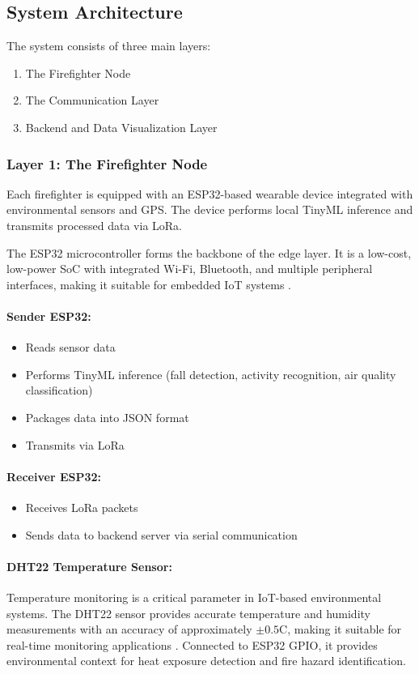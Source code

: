 \documentclass[12pt,a4paper]{article}
\begin{document}
	\subsection{System Architecture}
	The system consists of three main layers:
	\begin{enumerate}
		\item The Firefighter Node
		\item The Communication Layer
		\item Backend and Data Visualization Layer
	\end{enumerate}
	
	\subsubsection{Layer 1: The Firefighter Node}
	Each firefighter is equipped with an ESP32-based wearable device integrated with environmental sensors and GPS. The device performs local TinyML inference and transmits processed data via LoRa.
	
	The ESP32 microcontroller forms the backbone of the edge layer. It is a low-cost, low-power SoC with integrated Wi-Fi, Bluetooth, and multiple peripheral interfaces, making it suitable for embedded IoT systems \cite{dey2023}.
	
	\paragraph{Sender ESP32:}
	\begin{itemize}
		\item Reads sensor data
		\item Performs TinyML inference (fall detection, activity recognition, air quality classification)
		\item Packages data into JSON format
		\item Transmits via LoRa
	\end{itemize}
	
	\paragraph{Receiver ESP32:}
	\begin{itemize}
		\item Receives LoRa packets
		\item Sends data to backend server via serial communication
	\end{itemize}
	
	\paragraph{DHT22 Temperature Sensor:}
	Temperature monitoring is a critical parameter in IoT-based environmental systems. The DHT22 sensor provides accurate temperature and humidity measurements with an accuracy of approximately $\pm0.5$\textdegree C, making it suitable for real-time monitoring applications \cite{ahmad2021}. Connected to ESP32 GPIO, it provides environmental context for heat exposure detection and fire hazard identification.
	
\end{document}
